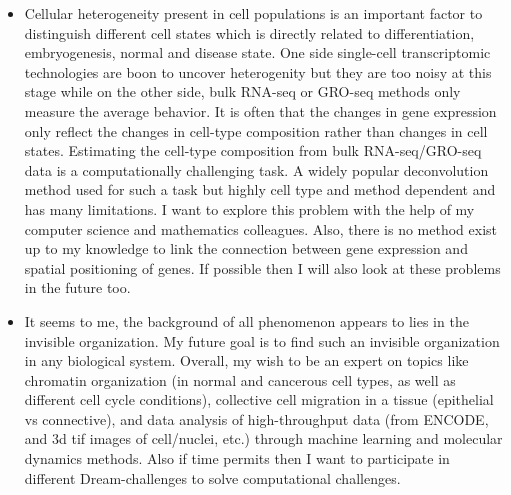 \documentclass{res}
\begin{document}
\begin{resume}
\begin{itemize}
\begin{itemize}
\item Cellular heterogeneity present in cell populations is an important factor to distinguish different cell states which is directly related to differentiation, embryogenesis, normal and disease state. One side single-cell transcriptomic technologies are boon to uncover heterogenity but they are too noisy at this stage while on the other side, bulk RNA-seq or GRO-seq methods only measure the average behavior. It is often that the changes in gene expression only reflect the changes in cell-type composition rather than changes in cell states. Estimating the cell-type composition from bulk RNA-seq/GRO-seq data is a computationally challenging task. A widely popular deconvolution method used for such a task but highly cell type and method dependent and has many limitations. I want to explore this problem with the help of my computer science and mathematics colleagues. Also, there is no method exist up to my knowledge to link the connection between gene expression and spatial positioning of genes. If possible then I will also look at these problems in the future too.   


\item  It seems to me, the background of all phenomenon appears to lies in the invisible organization. My future goal is to find such an invisible organization in any biological system.  Overall, my wish to be an expert on topics like chromatin organization (in normal and cancerous cell types, as well as different cell cycle conditions), collective cell migration in a tissue (epithelial vs connective), and data analysis of high-throughput data (from ENCODE, and 3d tif images of cell/nuclei, etc.) through machine learning and molecular dynamics methods. Also if time permits then I want to participate in different Dream-challenges to solve computational challenges.     
  

\end{itemize}






\end{itemize}
\end{resume}
\end{document}
